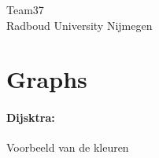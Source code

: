 \documentclass[a4paper]{article}
\begin{document}
\null\vfill
\begin{center}
{\huge Team37}\\
\vspace{10cm}
{\large Radboud University Nijmegen}
\end{center}
\vfill
\thispagestyle{empty} %
\newpage

\clearpage
\setcounter{page}{1}


\section{Graphs}
\paragraph{Dijsktra:} \hfill
Voorbeeld van de kleuren

\end{document}
